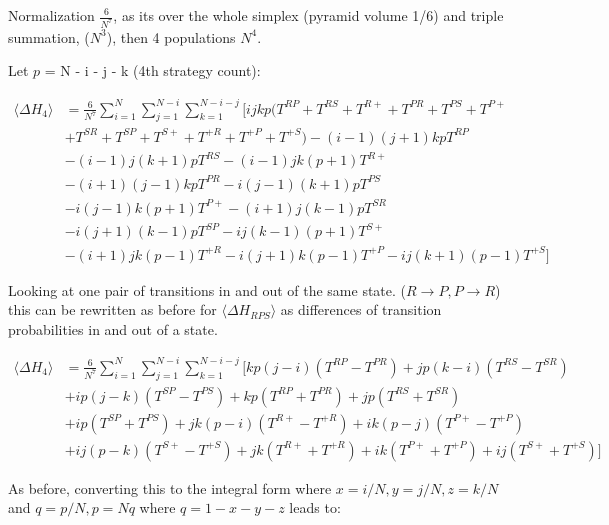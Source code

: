 \documentclass[./main.tex]{subfiles}
\begin{document}
Normalization $\frac{6}{N^7}$, as its over the whole simplex (pyramid volume 1/6) and triple summation, ($N^3$), then 4 populations $N^4$.

\hfill

Let $p$ = N - i - j - k (4th strategy count):


\begin{equation} \label{delta_h_4}
\begin{aligned}
  \langle \Delta H_{4} \rangle &= \frac{6}{N^7} \sum_{i=1}^{N} \sum_{j=1}^{N-i}  \sum_{k=1}^{N-i-j} \Big[ijkp
  (T^{RP} + T^{RS} + T^{R+} + T^{PR} + T^{PS} + T^{P+} \\
  &+ T^{SR} + T^{SP} + T^{S+} + T^{+R} + T^{+P} + T^{+S}) - (i-1)(j+1)kpT^{RP} \\
  &- (i-1)j(k+1)pT^{RS} - (i-1)jk(p+ 1)T^{R+} \\
  &- (i+1)(j-1)kpT^{PR} - i(j-1)(k+1)pT^{PS} \\
  &- i(j-1)k(p + 1)T^{P+} - (i+1)j(k-1)pT^{SR} \\
  &- i(j+1)(k-1)pT^{SP} - ij(k-1)(p + 1)T^{S+} \\
  &- (i+1)jk(p - 1)T^{+R} - i(j+1)k(p - 1)T^{+P} - ij(k+1)(p - 1)T^{+S}\Big]
\end{aligned}
\end{equation}


Looking at one pair of transitions in and out of the same state. ($R
\rightarrow P, P \rightarrow R$) this can be rewritten as before for 
$\langle \Delta H_{RPS} \rangle$ as differences of transition probabilities
in and out of a state.


\begin{equation} \label{delta_h_4_pairs}
\begin{aligned}
  \langle \Delta H_{4} \rangle &= \frac{6}{N^7} \sum_{i=1}^{N} \sum_{j=1}^{N-i}  \sum_{k=1}^{N-i-j} \Big[
  kp(j-i)(T^{RP} - T^{PR}) + jp(k-i)(T^{RS} - T^{SR}) \\
  &+ ip(j-k)(T^{SP} - T^{PS}) + kp(T^{RP} + T^{PR}) + jp(T^{RS} + T^{SR}) \\
  &+ ip(T^{SP} + T^{PS}) + jk(p-i)(T^{R+} - T^{+R}) + ik(p-j)(T^{P+} - T^{+P}) \\
  &+ ij(p-k)(T^{S+} - T^{+S}) + jk(T^{R+} + T^{+R}) + ik(T^{P+} + T^{+P}) + ij(T^{S+} + T^{+S})\Big]
\end{aligned}
\end{equation}

As before, converting this to the integral form where $x= i / N, y = j/N, z=k/N$ and $q=p/N, p=Nq$ where $q=1-x-y-z$ leads to:
\end{document}
